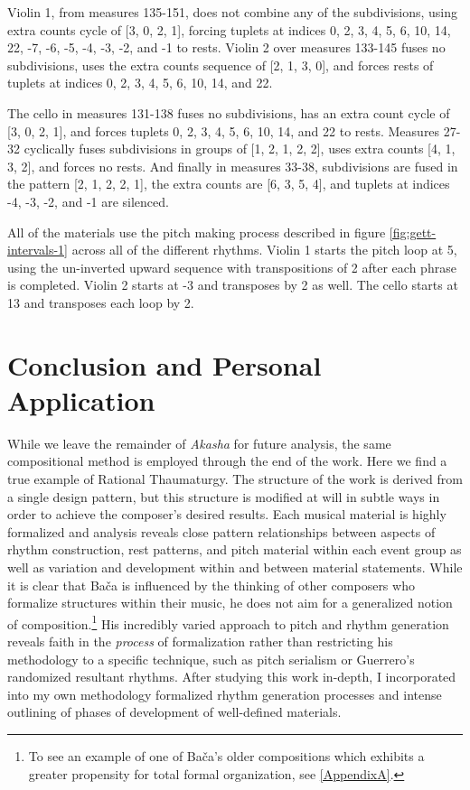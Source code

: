 \setcounter{subFigure}{0}
\renewcommand{\thefigure}{\thechapter.\arabic{figure}}

Violin 1, from measures 135-151, does not combine any of the subdivisions, using extra counts cycle of [3, 0, 2, 1], forcing tuplets at indices 0, 2, 3, 4, 5, 6, 10, 14, 22, -7, -6, -5, -4, -3, -2, and -1 to rests. Violin 2 over measures 133-145 fuses no subdivisions, uses the extra counts sequence of [2, 1, 3, 0], and forces rests of tuplets at indices 0, 2, 3, 4, 5, 6, 10, 14, and 22.

The cello in measures 131-138 fuses no subdivisions, has an extra count cycle of [3, 0, 2, 1], and forces tuplets 0, 2, 3, 4, 5, 6, 10, 14, and 22 to rests. Measures 27-32 cyclically fuses subdivisions in groups of [1, 2, 1, 2, 2], uses extra counts [4, 1, 3, 2], and forces no rests. And finally in measures 33-38, subdivisions are fused in the pattern [2, 1, 2, 2, 1], the extra counts are [6, 3, 5, 4], and tuplets at indices -4, -3, -2, and -1 are silenced.

All of the  materials use the pitch making process described in figure \ref{fig:gett-intervals-1} across all of the different rhythms. Violin 1 starts the pitch loop at 5, using the un-inverted upward sequence with transpositions of 2 after each phrase is completed. Violin 2 starts at -3 and transposes by 2 as well. The cello starts at 13 and transposes each loop by 2.

\section{Conclusion and Personal Application}

While we leave the remainder of \textit{Akasha} for future analysis, the same compositional method is employed through the end of the work. Here we find a true example of Rational Thaumaturgy. The structure of the work is derived from a single design pattern, but this structure is modified at will in subtle ways in order to achieve the composer's desired results. Each musical material is highly formalized and analysis reveals close pattern relationships between aspects of rhythm construction, rest patterns, and pitch material within each event group as well as variation and development within and between material statements. While it is clear that Bača is influenced by the thinking of other composers who formalize structures within their music, he does not aim for a generalized notion of composition.\footnote{To see an example of one of Bača's older compositions which exhibits a greater propensity for total formal organization, see \vref{AppendixA}.} His incredibly varied approach to pitch and rhythm generation reveals faith in the \textit{process} of formalization rather than restricting his methodology to a specific technique, such as pitch serialism or Guerrero's randomized resultant rhythms. After studying this work in-depth, I incorporated into my own methodology formalized rhythm generation processes and intense outlining of phases of development of well-defined materials.

